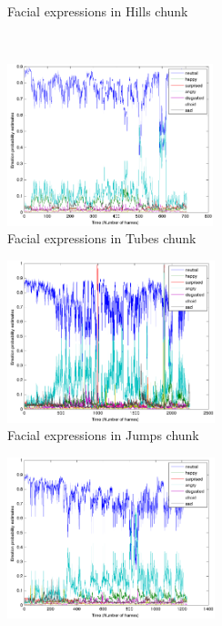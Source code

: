 \documentclass[letterpaper]{article}
\begin{document}
\begin{figure}[t]
\begin{subfigure}[t]{0.32\textwidth}
                \caption{Facial expressions in Hills chunk}
								\label{fig:sectionHillsEmotions}
        \end{subfigure}%
        \\ %
        \begin{subfigure}[t]{0.32\textwidth}
								\centering
                \includegraphics[height=4.7cm,keepaspectratio]{images/paris/sectionTubesEmotions.png}
                \caption{Facial expressions in Tubes chunk}
								\label{fig:sectionTubesEmotions}
        \end{subfigure}%
				\quad
        \begin{subfigure}[t]{0.32\textwidth}
								\centering
                \includegraphics[height=4.7cm,keepaspectratio]{images/paris/sectionJumpsEmotions.png}
                \caption{Facial expressions in Jumps chunk}
								\label{fig:sectionJumpsEmotions}
        \end{subfigure}%
				\quad
        \begin{subfigure}[t]{0.32\textwidth}
								\centering
                \includegraphics[height=4.7cm,keepaspectratio]{images/paris/sectionCannonsEmotions.png}

\end{subfigure}
\end{figure}
\end{document}
